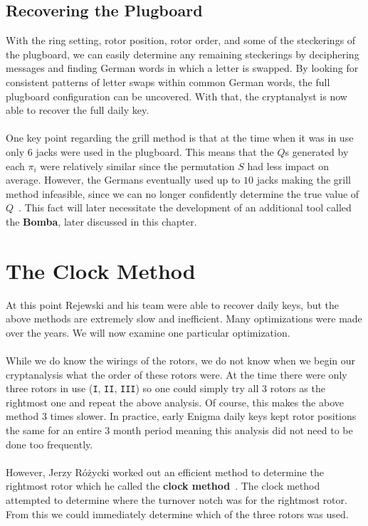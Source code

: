 \subsection{Recovering the Plugboard}
With the ring setting, rotor position, rotor order, and some of the
steckerings of the plugboard, we can easily determine any remaining
steckerings by deciphering messages and finding German words in which
a letter is swapped. By looking for consistent patterns of letter
swaps within common German words, the full plugboard configuration
can be uncovered. With that, the cryptanalyst is now able to recover
the full daily key.
\\\\One key point regarding the grill method is that at the time when
it was in use only $6$ jacks were used in the plugboard. This means
that the $Q$s generated by each $\pi_i$ were relatively similar
since the permutation $S$ had less impact on average. However, the
Germans eventually used up to $10$ jacks making the grill method
infeasible, since we can no longer confidently determine the true
value of $Q$~\cite[pp.~237, 242]{KozaczukEnigma1984}. This fact will later necessitate the development of an
additional tool called the {\bf{Bomba}}, later discussed in this chapter.
\section{The Clock Method}\label{clock_method}

At this point Rejewski and his team were able to recover daily keys,
but the above methods are extremely slow and inefficient. Many
optimizations were made over the years. We will now examine one
particular optimization.
\\\\While we do know the wirings of the rotors, we do not know when
we begin our cryptanalysis what the order of these rotors were. At
the time there were only three rotors in use (\texttt{I},
\texttt{II}, \texttt{III}) so one could simply try all 3 rotors as
the rightmost one and repeat the above analysis. Of course, this
makes the above method 3 times slower. In practice, early Enigma
daily keys kept rotor positions the same for an entire 3 month period
meaning this analysis did not need to be done too frequently.
\\\\However, Jerzy Różycki worked out an efficient method to
determine the rightmost rotor which he called the {\bf{clock
method}}~\cite[p.~223]{Rejewski1981}. The clock method attempted to determine where the turnover
notch was for the rightmost rotor. From this we could immediately
determine which of the three rotors was used.

